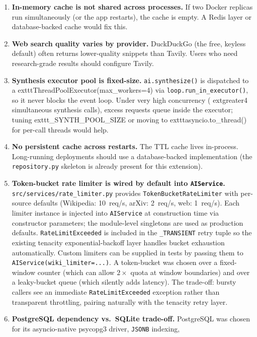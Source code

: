 \documentclass[12pt,a4paper]{article}
\begin{document}
\begin{enumerate}
  \item \textbf{In-memory cache is not shared across processes.} If two Docker replicas run
    simultaneously (or the app restarts), the cache is empty. A Redis layer or database-backed
    cache would fix this.
  \item \textbf{Web search quality varies by provider.} DuckDuckGo (the free, keyless default)
    often returns lower-quality snippets than Tavily. Users who need research-grade results
    should configure Tavily.
  \item \textbf{Synthesis executor pool is fixed-size.} \texttt{ai.synthesize()} is dispatched to a 	exttt{ThreadPoolExecutor(max\_workers=4)} via \texttt{loop.run\_in\_executor()}, so it never blocks the event loop. Under very high concurrency (	extgreater{}4 simultaneous synthesis calls), excess requests queue inside the executor; tuning 	exttt{\_SYNTH\_POOL\_SIZE} or moving to 	exttt{asyncio.to\_thread()} for per-call threads would help.
  \item \textbf{No persistent cache across restarts.} The TTL cache lives in-process. Long-running
    deployments should use a database-backed implementation (the \texttt{repository.py}
    skeleton is already present for this extension).
  \item \textbf{Token-bucket rate limiter is wired by default into \texttt{AIService}.}
    \texttt{src/services/rate\_limiter.py} provides \texttt{TokenBucketRateLimiter} with
    per-source defaults (Wikipedia: 10~req/s, arXiv: 2~req/s, web: 1~req/s).
    Each limiter instance is injected into \texttt{AIService} at construction time via
    constructor parameters; the module-level singletons are used as production defaults.
    \texttt{RateLimitExceeded} is included in the \texttt{\_TRANSIENT} retry tuple so the
    existing tenacity exponential-backoff layer handles bucket exhaustion automatically.
    Custom limiters can be supplied in tests by passing them to \texttt{AIService(wiki\_limiter=...)}.
    A token-bucket was chosen over a fixed-window counter (which can allow $2\times$ quota
    at window boundaries) and over a leaky-bucket queue (which silently adds latency).
    The trade-off: bursty callers see an immediate \texttt{RateLimitExceeded} exception
    rather than transparent throttling, pairing naturally with the tenacity retry layer.
  \item \textbf{PostgreSQL dependency vs.\ SQLite trade-off.}
    PostgreSQL was chosen for its asyncio-native psycopg3 driver, \texttt{JSONB} indexing,

\end{enumerate}
\end{document}
